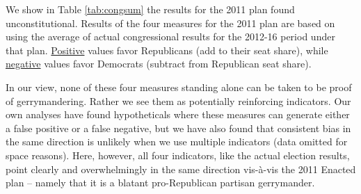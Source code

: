 \par
    We show in Table \ref{tab:congsum} the results for the 2011 plan found unconstitutional. Results of the four measures for the 2011 plan are based on using the average of actual congressional results for the 2012-16 period under that plan. \underline{Positive} values favor Republicans (add to their seat share), while \underline{negative} values favor Democrats (subtract from Republican seat share).   
\par
    In our view, none of these four measures standing alone can be taken to be proof of gerrymandering. Rather we see them as potentially reinforcing indicators. Our own analyses have found hypotheticals where these measures can generate either a false positive or a false negative, but we have also found that consistent bias in the same direction is unlikely when we use multiple indicators (data omitted for space reasons). Here, however, all four indicators, like the actual election results, point clearly and overwhelmingly in the same direction vis-à-vis the 2011 Enacted plan -- namely that it is a blatant pro-Republican partisan gerrymander.
%
